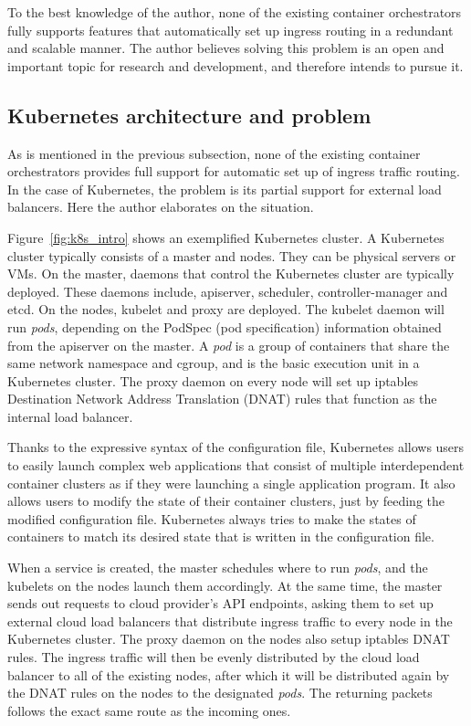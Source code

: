To the best knowledge of the author, none of the existing container orchestrators fully supports features that automatically set up ingress routing in a redundant and scalable manner.
The author believes solving this problem is an open and important topic for research and development, and therefore intends to pursue it.

\FloatBarrier

\subsection{Kubernetes architecture and problem}

As is mentioned in the previous subsection, none of the existing container orchestrators provides full support for automatic set up of ingress traffic routing.
In the case of Kubernetes, the problem is its partial support for external load balancers.
Here the author elaborates on the situation.

Figure~\ref{fig:k8s_intro} shows an exemplified Kubernetes cluster.
A Kubernetes cluster typically consists of a master and nodes. They can be physical servers or VMs.
On the master, daemons that control the Kubernetes cluster are typically deployed. 
These daemons include, apiserver, scheduler, controller-manager and etcd. 
On the nodes, kubelet and proxy are deployed.
The kubelet daemon will run {\it pods}, depending on the PodSpec (pod specification) information obtained from the apiserver on the master.
A {\em pod} is a group of containers that share the same network namespace and cgroup, and is the basic execution unit in a Kubernetes cluster.
The proxy daemon on every node will set up iptables Destination Network Address Translation (DNAT) rules that function as the internal load balancer.


Thanks to the expressive syntax of the configuration file, Kubernetes allows users to easily launch complex web applications that consist of multiple interdependent container clusters as if they were launching a single application program.
It also allows users to modify the state of their container clusters, just by feeding the modified configuration file.
Kubernetes always tries to make the states of containers to match its desired state that is written in the configuration file.

When a service is created, the master schedules where to run {\em pods}, and the kubelets on the nodes launch them accordingly.
At the same time, the master sends out requests to cloud provider's API endpoints, asking them to set up external cloud load balancers that distribute ingress traffic to every node in the Kubernetes cluster.
The proxy daemon on the nodes also setup iptables DNAT rules. 
The ingress traffic will then be evenly distributed by the cloud load balancer to all of the existing nodes, 
after which it will be distributed again by the DNAT rules on the nodes to the designated {\em pods}. 
The returning packets follows the exact same route as the incoming ones.

